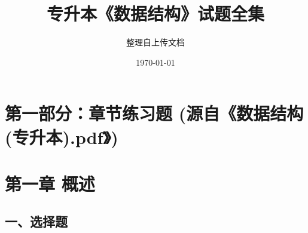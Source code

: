 \documentclass[12pt, a4paper]{article}
\title{\textbf{专升本《数据结构》试题全集}}
\author{整理自上传文档}
\date{\today}
\begin{document}
\maketitle
\tableofcontents
\newpage

\section*{第一部分：章节练习题 (源自《数据结构(专升本).pdf》)}

\section{第一章 概述}

\subsection*{一、选择题}
\end{document}
